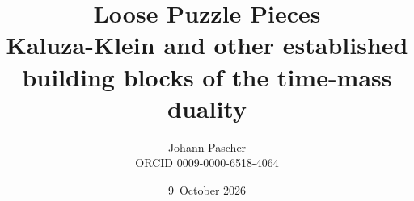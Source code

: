 \documentclass[11pt,a4paper]{report}
\title{Loose Puzzle Pieces\\[0.5em]
  \large Kaluza-Klein and other established building blocks of the time-mass duality}
\date{9~October 2026}
\author{Johann Pascher\\\small ORCID 0009-0000-6518-4064}
\begin{document}
\renewcommand{\thechapter}{}
\renewcommand{\thesection}{\arabic{section}}
\maketitle
\tableofcontents

\end{document}
